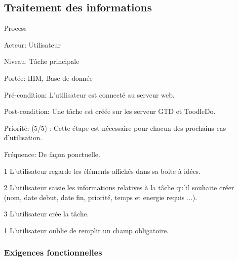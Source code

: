 		
	
		
		
		
		
\subsection{Traitement des informations}
\begin{usecase}{Process}

\begin{information}
\item[Acteur: ] Utilisateur
\item[Niveau:] Tâche principale
\item[Portée:] IHM, Base de donnée 
\item[Pré-condition:] L'utilisateur est connecté au serveur web. 
\item[Post-condition:] Une tâche est créée sur les serveur GTD et ToodleDo. 
\item[Priorité:] (5/5) : Cette étape est nécessaire pour chacun des prochains cas d'utilisation.
\item[Fréquence:] De façon ponctuelle.	
\end{information}	

\begin{scenario}
\item[1] L'utilisateur regarde les éléments affichés dans sa boite à idées.
\item[2] L'utilisateur saisie les informations relatives à la tâche qu'il souhaite créer (nom, date debut, date fin, priorité, temps et energie requis ...).
\item[3] L'utilisateur crée la tâche.
\end{scenario}	

\begin{extension}
	\item[1]L'utilisateur oublie de remplir un champ obligatoire.
\end{extension}
\end{usecase}

\subsubsection{Exigences fonctionnelles}

